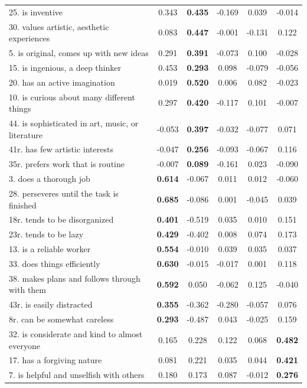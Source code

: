 \documentclass[11pt,a5paper,twoside]{book}
\begin{document}
\begin{table}[ht]
{\begin{tabular}{lccccc}
25. is inventive& 0.343 & \textbf{0.435} & -0.169 & 0.039 & -0.014 \\ 
30. values artistic, aesthetic experiences & 0.083 & \textbf{0.447} & -0.001 & -0.131 & 0.122 \\ 
5. is original, comes up with new ideas& 0.291 & \textbf{0.391 }& -0.073 & 0.100 & -0.028 \\ 
15. is ingenious, a deep thinker & 0.453 & \textbf{0.293} & 0.098 & -0.079 & -0.056 \\ 
20. has an active imagination & 0.019 & \textbf{0.520} & 0.006 & 0.082 & -0.023 \\ 
10. is curious about many different things & 0.297 & \textbf{0.420} & -0.117 & 0.101 & -0.007 \\ 
44. is sophisticated in art, music, or literature & -0.053 & \textbf{0.397} & -0.032 & -0.077 & 0.071 \\ 
41r. has few artistic interests & -0.047 & \textbf{0.256} & -0.093 & -0.067 & 0.116 \\ 
35r. prefers work that is routine & -0.007 & \textbf{0.089} & -0.161 & 0.023 & -0.090 \\ 
3. does a thorough job & \textbf{0.614} & -0.067 & 0.011 & 0.012 & -0.060 \\ 
28. perseveres until the task is finished & \textbf{0.685} & -0.086 & 0.001 & -0.045 & 0.039 \\ 
18r. tends to be disorganized & \textbf{0.401} & -0.519 & 0.035 & 0.010 & 0.151 \\ 
23r. tends to be lazy & \textbf{0.429} & -0.402 & 0.008 & 0.074 & 0.173 \\ 
13. is a reliable worker & \textbf{0.554} & -0.010 & 0.039 & 0.035 & 0.037 \\ 
33. does things efficiently & \textbf{0.630} & -0.015 & -0.017 & 0.001 & 0.118 \\ 
38. makes plans and follows through with them & \textbf{0.592} & 0.050 & -0.062 & 0.125 & -0.040 \\ 
43r. is easily distracted & \textbf{0.355} & -0.362 & -0.280 & -0.057 & 0.076 \\ 
8r. can be somewhat careless & \textbf{0.293} & -0.487 & 0.043 & -0.025 & 0.159 \\ 
32. is considerate and kind to almost everyone & 0.165 & 0.228 & 0.122 & 0.068 & \textbf{0.482} \\ 
17. has a forgiving nature & 0.081 & 0.221 & 0.035 & 0.044 & \textbf{0.421} \\ 
7. is helpful and unselfish with others & 0.180 & 0.173 & 0.087 & -0.012 &\textbf{ 0.276} \\ 

\end{tabular}}
\end{table}
\end{document}
